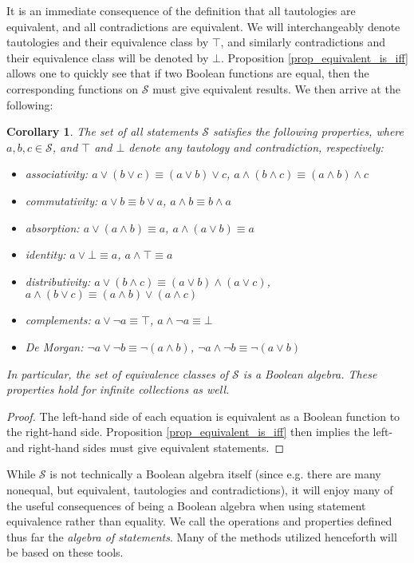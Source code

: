 \documentclass[psamsfonts]{amsart}
\newtheorem{cor}[thm]{Corollary}
\theoremstyle{definition}
\theoremstyle{remark}
\numberwithin{equation}{section}
\def\tautology{\top}
\def\contradiction{\bot}
\def\AND{\wedge}
\def\OR{\vee}
\def\NOT{\neg}
\begin{document}
It is an immediate consequence of the definition that all tautologies are equivalent, and all contradictions are equivalent. We will interchangeably denote tautologies and their equivalence class by $\tautology$, and similarly contradictions and their equivalence class will be denoted by $\contradiction$. Proposition \ref{prop_equivalent_is_iff} allows one to quickly see that if two Boolean functions are equal, then the corresponding functions on $\mathcal{S}$ must give equivalent results. We then arrive at the following:

\begin{cor}\label{boolean_properties}
		The set of all statements $\mathcal{S}$ satisfies the following properties, where $a,b,c\in\mathcal{S}$, and $\tautology$ and $\contradiction$ denote any tautology and contradiction, respectively:
		\begin{itemize}
			\item associativity: $a \OR (b \OR c) \equiv (a \OR b) \OR c$, $a \AND (b \AND c) \equiv (a \AND b) \AND c$
			\item commutativity: $a \OR b \equiv b \OR a$, $a \AND b \equiv b \AND a$
			\item absorption: $a \OR (a \AND b) \equiv a$, $a \AND (a \OR b) \equiv a$
			\item identity: $a \OR \contradiction \equiv a
			$, $a \AND \tautology \equiv a$
			\item distributivity: $a \OR (b \AND c) \equiv (a \OR b) \AND (a \OR c)$, $a \AND (b \OR c) \equiv (a \AND b) \OR (a \AND c)$
			\item complements: $a \OR \NOT a \equiv \tautology$, $a \AND \NOT a \equiv \contradiction$
			\item De Morgan: $\NOT a \OR \NOT b \equiv \NOT (a \AND b)$, $\NOT a \AND \NOT b \equiv \NOT (a \OR b)$
		\end{itemize}
		In particular, the set of equivalence classes of $\mathcal{S}$ is a Boolean algebra. These properties hold for infinite collections as well. 
	\end{cor}
\begin{proof}
The left-hand side of each equation is equivalent as a Boolean function to the right-hand side. Proposition \ref{prop_equivalent_is_iff} then implies the left- and right-hand sides must give equivalent statements. 
\end{proof}

While $\mathcal{S}$ is not technically a Boolean algebra itself (since e.g. there are many nonequal, but equivalent, tautologies and contradictions), it will enjoy many of the useful consequences of being a Boolean algebra when using statement equivalence rather than equality. We call the operations and properties defined thus far the \emph{algebra of statements}. Many of the methods utilized henceforth will be based on these tools. 
\end{document}
